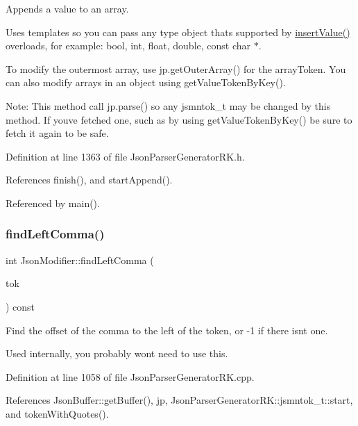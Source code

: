 Appends a value to an array. 

Uses templates so you can pass any type object that\textquotesingle{}s supported by \hyperlink{class_json_writer_ac58734c238ba7be066838591b0cc7743}{insert\+Value()} overloads, for example\+: bool, int, float, double, const char $\ast$.

To modify the outermost array, use jp.\+get\+Outer\+Array() for the array\+Token. You can also modify arrays in an object using get\+Value\+Token\+By\+Key().

Note\+: This method call jp.\+parse() so any jsmntok\+\_\+t may be changed by this method. If you\textquotesingle{}ve fetched one, such as by using get\+Value\+Token\+By\+Key() be sure to fetch it again to be safe. 

Definition at line 1363 of file Json\+Parser\+Generator\+R\+K.\+h.



References finish(), and start\+Append().



Referenced by main().

\mbox{\label{class_json_modifier_a5b67ce1041b0e40e467639de1eeeca1e}} 
\subsubsection{\texorpdfstring{find\+Left\+Comma()}{findLeftComma()}}
{\footnotesize\ttfamily int Json\+Modifier\+::find\+Left\+Comma (\begin{DoxyParamCaption}\item[{const \hyperlink{struct_json_parser_generator_r_k_1_1jsmntok__t}{Json\+Parser\+Generator\+R\+K\+::jsmntok\+\_\+t} $\ast$}]{tok }\end{DoxyParamCaption}) const}



Find the offset of the comma to the left of the token, or -\/1 if there isn\textquotesingle{}t one. 

Used internally, you probably won\textquotesingle{}t need to use this. 

Definition at line 1058 of file Json\+Parser\+Generator\+R\+K.\+cpp.



References Json\+Buffer\+::get\+Buffer(), jp, Json\+Parser\+Generator\+R\+K\+::jsmntok\+\_\+t\+::start, and token\+With\+Quotes().



